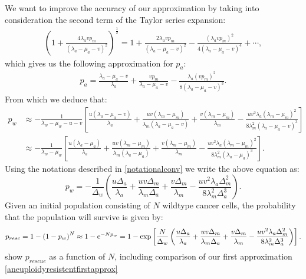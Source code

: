 \documentclass[12pt]{extarticle}
\newcommand{\e}{{\rm e}}
\begin{document}
We want to improve the accuracy of our approximation by taking into consideration the second term of the Taylor series expansion:
\begin{align*}
\left(1+\frac{4\lambda_avp_m}{\left(\lambda_a-\mu_a-v\right)^2}\right)^{\frac{1}{2}}=1+\frac{2\lambda_avp_m}{\left(\lambda_a-\mu_a-v\right)^2}-\frac{\left(\lambda_avp_m\right)^2}{4\left(\lambda_a-\mu_a-v\right)^4}+\cdots,
\end{align*}
which gives us the following approximation for $p_a$:
\begin{align}
p_a=\frac{\lambda_a-\mu_a-v}{\lambda_a}+\frac{vp_m}{\lambda_a-\mu_a-v}-\frac{\lambda_a\left(vp_m\right)^2}{8\left(\lambda_a-\mu_a-v\right)^3}.
\end{align}
From which we deduce that:
\begin{align}\nonumber
p_w&\approx-\frac{1}{\lambda_w-\mu_w-u-v}\left[\frac{u\left(\lambda_a-\mu_a-v\right)}{\lambda_a}+\frac{uv\left(\lambda_m-\mu_m\right)}{\lambda_m\left(\lambda_a-\mu_a-v\right)}+\frac{v\left(\lambda_m-\mu_m\right)}{\lambda_m}-\frac{uv^2\lambda_a\left(\lambda_m-\mu_m\right)^2}{8\lambda_m^2\left(\lambda_a-\mu_a-v\right)^3}\right]\\ \label{survprobw3}
&\approx-\frac{1}{\lambda_w-\mu_w}\left[\frac{u\left(\lambda_a-\mu_a\right)}{\lambda_a}+\frac{uv\left(\lambda_m-\mu_m\right)}{\lambda_m\left(\lambda_a-\mu_a\right)}+\frac{v\left(\lambda_m-\mu_m\right)}{\lambda_m}-\frac{uv^2\lambda_a\left(\lambda_m-\mu_m\right)^2}{8\lambda_m^2\left(\lambda_a-\mu_a\right)^3}\right].
\end{align}
Using the notations described in \eqref{notationalconv} we write the above equation as:
\begin{equation}\label{survprobwapproxcorrected}
p_w=-\frac{1}{\Delta_w}\left(\frac{u\Delta_a}{\lambda_a}+\frac{uv\Delta_m}{\lambda_m\Delta_a}+\frac{v\Delta_m}{\lambda_m}-\frac{uv^2\lambda_a\Delta_m^2}{8\lambda_m^2\Delta_a^3}\right).
\end{equation}
Given an initial population consisting of $N$ wildtype cancer cells, the probability that the population will survive is given by: 
\begin{align}\label{survprobresistantaneuploidy}
p_{resc}=1-\left(1-p_w\right)^N\approx 1-\e^{-Np_w}=1-\exp\left[\frac{N}{\Delta_w}\left(\frac{u\Delta_a}{\lambda_a}+\frac{uv\Delta_m}{\lambda_m\Delta_a}+\frac{v\Delta_m}{\lambda_m}-\frac{uv^2\lambda_a\Delta_m^2}{8\lambda_m^2\Delta_a^3}\right)\right].
\end{align}
 show $p_{rescue}$ as a function of $N$, including comparison of our first approximation \eqref{aneuploidyresistentfirstapprox} %
\end{document}
